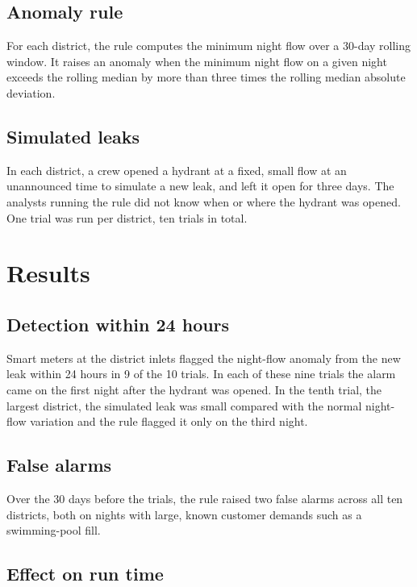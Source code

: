 \documentclass{article}
\begin{document}
\subsection{Anomaly rule}
\label{sec:method-rule}

For each district, the rule computes the minimum night flow over a 30-day
rolling window. It raises an anomaly when the minimum night flow on a given
night exceeds the rolling median by more than three times the rolling
median absolute deviation.

\subsection{Simulated leaks}
\label{sec:method-trials}

In each district, a crew opened a hydrant at a fixed, small flow at an
unannounced time to simulate a new leak, and left it open for three days. The
analysts running the rule did not know when or where the hydrant was opened.
One trial was run per district, ten trials in total.

\section{Results}
\label{sec:results}

\subsection{Detection within 24 hours}
\label{sec:results-detection}

Smart meters at the district inlets flagged the night-flow anomaly from the
new leak within 24 hours in 9 of the 10 trials. In each of these nine trials
the alarm came on the first night after the hydrant was opened. In the tenth
trial, the largest district, the simulated leak was small compared with the
normal night-flow variation and the rule flagged it only on the third night.

\subsection{False alarms}
\label{sec:results-false}

Over the 30 days before the trials, the rule raised two false alarms across all
ten districts, both on nights with large, known customer demands such as a
swimming-pool fill.

\subsection{Effect on run time}
\label{sec:results-runtime}
\end{document}
